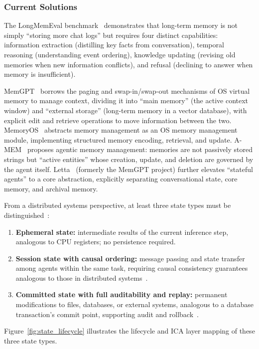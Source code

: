 \subsubsection{Current Solutions}
The LongMemEval benchmark~\cite{longmemeval2024} demonstrates that long-term memory is not simply ``storing more chat logs'' but requires four distinct capabilities: information extraction (distilling key facts from conversation), temporal reasoning (understanding event ordering), knowledge updating (revising old memories when new information conflicts), and refusal (declining to answer when memory is insufficient).

MemGPT~\cite{memgpt2023} borrows the paging and swap-in/swap-out mechanisms of OS virtual memory to manage context, dividing it into ``main memory'' (the active context window) and ``external storage'' (long-term memory in a vector database), with explicit edit and retrieve operations to move information between the two.
MemoryOS~\cite{memoryos2025} abstracts memory management as an OS memory management module, implementing structured memory encoding, retrieval, and update.
A-MEM~\cite{amem2025} proposes agentic memory management: memories are not passively stored strings but ``active entities'' whose creation, update, and deletion are governed by the agent itself.
Letta~\cite{letta_stateful_2026} (formerly the MemGPT project) further elevates ``stateful agents'' to a core abstraction, explicitly separating conversational state, core memory, and archival memory.

From a distributed systems perspective, at least three state types must be distinguished~\cite{raft2014,spanner2012,cap2002}:
\begin{enumerate}[nosep]
\item \textbf{Ephemeral state:} intermediate results of the current inference step, analogous to CPU registers; no persistence required.
\item \textbf{Session state with causal ordering:} message passing and state transfer among agents within the same task, requiring causal consistency guarantees analogous to those in distributed systems~\cite{raft2014}.
\item \textbf{Committed state with full auditability and replay:} permanent modifications to files, databases, or external systems, analogous to a database transaction's commit point, supporting audit and rollback~\cite{spanner2012}.
\end{enumerate}

Figure~\ref{fig:state_lifecycle} illustrates the lifecycle and ICA layer mapping of these three state types.


